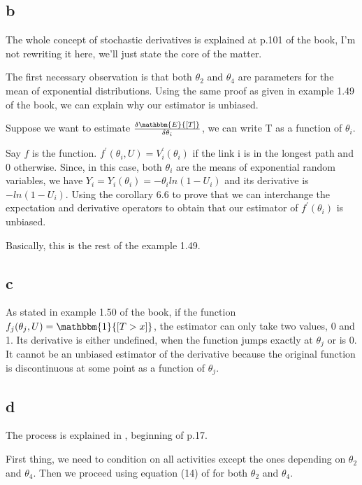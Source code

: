 \documentclass[12pt]{report}
\begin{document}
\subsection*{b}

The whole concept of stochastic derivatives is explained at p.101 of the book, I'm not rewriting it here, we'll just state the core of the matter.

The first necessary observation is that both $\theta_2$ and $\theta_4$ are parameters for the mean of exponential distributions. Using the same proof as given in example 1.49 of the book, we can explain why our estimator is unbiased.

Suppose we want to estimate $\frac{\delta\mathbbm{E}{[T]}}{\delta \theta_i}$, we can write T as a function of $\theta_i$. 

Say $f$ is the function. $f^{'}(\theta_i, U) = V^{'}_i(\theta_i)$ if the link i is in the longest path and 0 otherwise.
Since, in this case, both $\theta_i$ are the means of exponential random variables, we have $Y_i = Y_i(\theta_i) = -\theta_i ln(1 - U_i)$ and its derivative is $-ln(1-U_i)$. Using the corollary 6.6 to prove that we can interchange the expectation and derivative operators to obtain that our estimator of $f^{'}(\theta_i)$ is unbiased.

Basically, this is the rest of the example 1.49.

\subsection*{c}

As stated in example 1.50 of the book, if the function $f_j(\theta_j, U) = \mathbbm{1}{[T > x]}$, the estimator can only take
two values, 0 and 1. Its derivative is either undefined, when the
function jumps exactly at $\theta_j$ or is 0. It cannot be an unbiased estimator of the derivative because the original function is discontinuous at some point as a function of $\theta_j$.

\subsection*{d}

The process is explained in \citep{fu_gradient_2006}, beginning of p.17.

First thing, we need to condition on all activities except the ones depending on $\theta_2$ and $\theta_4$. Then we proceed using equation (14) of \citep{fu_sensitivity_2006} for both $\theta_2$ and $\theta_4$.
\end{document}
